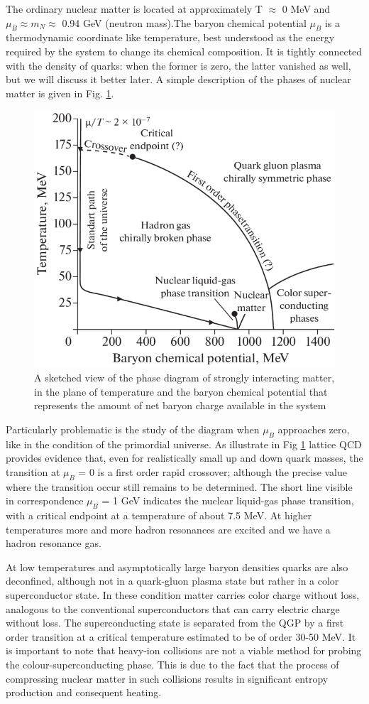 \documentclass[12pt,a4paper]{book}
\begin{document}
	The ordinary nuclear matter is located at approximately T $\approx$ 0 MeV and $\mu_B \approx m_N \approx$ 0.94 GeV (neutron mass).The baryon chemical potential $\mu_B$ is a thermodynamic coordinate like temperature, best understood as the energy required by the system to change its chemical composition. It is tightly connected with the density of quarks: when the former is zero, the latter vanished as well, but we will discuss it better later. A simple description of the phases of nuclear matter is given in Fig. \ref{fig:QCD_phase_diagram}. 
	\begin{figure}[ht]
		\centering
		\includegraphics[width=0.7\linewidth]{pictures/QCD_phase_diagram.png}
		\caption{A sketched view of the phase diagram of strongly interacting matter, in the plane of temperature and the baryon chemical potential that represents the amount of net baryon charge available in the system \cite{PhysRevD.101.103007}}
		\label{fig:QCD_phase_diagram} 
	\end{figure}
	Particularly problematic is the study of the diagram when $\mu_B$ approaches zero, like in the condition of the primordial universe. As illustrate in Fig \ref{fig:QCD_phase_diagram} lattice QCD provides evidence that, even for realistically small up and down quark masses, the transition at $\mu_B$ = 0 is a first order rapid crossover; although the precise value where the transition occur still remains to be determined. The short line visible in correspondence $\mu_B$ = 1 GeV indicates the nuclear liquid-gas phase transition, with a critical endpoint at a temperature of about 7.5 MeV. At higher temperatures more and more hadron resonances are excited and we have a hadron resonance gas.
	
	At low temperatures and asymptotically large baryon densities quarks are also deconfined, although not in a quark-gluon plasma state but rather in a color superconductor state. In these condition matter carries color charge without loss, analogous to the conventional superconductors that can carry electric charge without loss. The superconducting state is separated from the QGP by a first order transition at a critical temperature estimated to be of order 30-50 MeV. It is important to note that heavy-ion collisions are not a viable method for probing the colour-superconducting phase. This is due to the fact that the process of compressing nuclear matter in such collisions results in significant entropy production and consequent heating.
	
\end{document}

